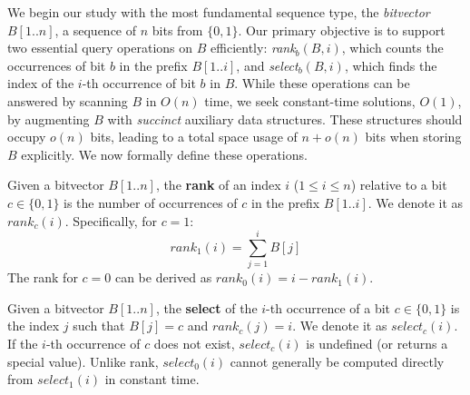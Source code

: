 We begin our study with the most fundamental sequence type, the \emph{bitvector} $B[1..n]$, a sequence of $n$ bits from $\{0, 1\}$. Our primary objective is to support two essential query operations on $B$ efficiently: \emph{\textsf{rank}}$_b(B, i)$, which counts the occurrences of bit $b$ in the prefix $B[1..i]$, and \emph{\textsf{select}}$_b(B, i)$, which finds the index of the $i$-th occurrence of bit $b$ in $B$. While these operations can be answered by scanning $B$ in $O(n)$ time, we seek constant-time solutions, $O(1)$, by augmenting $B$ with \emph{succinct} auxiliary data structures. These structures should occupy $o(n)$ bits, leading to a total space usage of $n+o(n)$ bits when storing $B$ explicitly. We now formally define these operations.

\begin{definition}[Rank]\label{def:rank}
    Given a bitvector $B[1..n]$, the \textbf{rank} of an index $i$ ($1 \le i \le n$) relative to a bit $c \in \{0, 1\}$ is the number of occurrences of $c$ in the prefix $B[1..i]$. We denote it as $rank_c(i)$.
    Specifically, for $c=1$:
    \[rank_1(i) = \sum_{j=1}^{i} B[j]\]
    The rank for $c=0$ can be derived as $rank_0(i) = i - rank_1(i)$.
\end{definition}

\begin{definition}[Select]\label{def:select}
    Given a bitvector $B[1..n]$, the \textbf{select} of the $i$-th occurrence of a bit $c \in \{0, 1\}$ is the index $j$ such that $B[j]=c$ and $rank_c(j) = i$. We denote it as $select_c(i)$. If the $i$-th occurrence of $c$ does not exist, $select_c(i)$ is undefined (or returns a special value). Unlike rank, $select_0(i)$ cannot generally be computed directly from $select_1(i)$ in constant time.
\end{definition}

